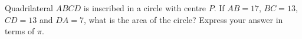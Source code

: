 Quadrilateral $ABCD$ is inscribed in a circle with centre $P$. If $AB=17$, $BC=13$, $CD=13$ and $DA=7$, what is the area of the circle? Express your answer in terms of $\pi$.
